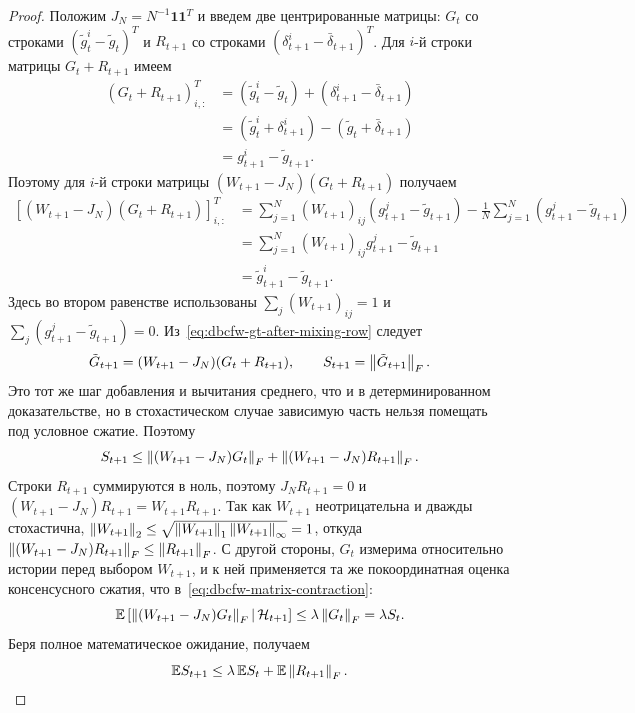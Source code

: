 \begin{proof}
Положим $J_N=N^{-1}\mathbf 1\mathbf 1^T$ и введем две центрированные матрицы:
$G_t$ со строками $(\tilde g_t^i-\tilde g_t)^T$ и
$R_{t+1}$ со строками $(\delta_{t+1}^i-\bar\delta_{t+1})^T$.
Для $i$-й строки матрицы $G_t+R_{t+1}$ имеем
\begin{align}
\label{eq:dbcfw-gt-before-mixing-row}
    (G_t+R_{t+1})_{i,:}^T
    &=
    (\tilde g_t^i-\tilde g_t)+(\delta_{t+1}^i-\bar\delta_{t+1})
    \nonumber\\
    &=
    (\tilde g_t^i+\delta_{t+1}^i)
    -
    (\tilde g_t+\bar\delta_{t+1})
    \nonumber\\
    &=
    g_{t+1}^i-\tilde g_{t+1}.
\end{align}
Поэтому для $i$-й строки матрицы $(W_{t+1}-J_N)(G_t+R_{t+1})$ получаем
\begin{align}
    \left[(W_{t+1}-J_N)(G_t+R_{t+1})\right]_{i,:}^T
    &=
    \sum_{j=1}^N (W_{t+1})_{ij}(g_{t+1}^j-\tilde g_{t+1})
    -
    \frac1N\sum_{j=1}^N(g_{t+1}^j-\tilde g_{t+1})
    \nonumber\\
    &=
    \sum_{j=1}^N (W_{t+1})_{ij}g_{t+1}^j
    -
    \tilde g_{t+1}
    \nonumber\\
    &=
    \tilde g_{t+1}^i-\tilde g_{t+1}.
    \label{eq:dbcfw-gt-after-mixing-row}
\end{align}
Здесь во втором равенстве использованы $\sum_j(W_{t+1})_{ij}=1$ и
$\sum_j(g_{t+1}^j-\tilde g_{t+1})=0$.
Из~\eqref{eq:dbcfw-gt-after-mixing-row} следует
\[
    \tilde G_{t+1}
    =
    (W_{t+1}-J_N)(G_t+R_{t+1}),
    \qquad
    S_{t+1}=\left\|\tilde G_{t+1}\right\|_F.
\]
Это тот же шаг добавления и вычитания среднего, что и в детерминированном доказательстве,
но в стохастическом случае зависимую часть нельзя помещать под условное сжатие.
Поэтому
\[
    S_{t+1}
    \leq
    \left\|(W_{t+1}-J_N)G_t\right\|_F
    +
    \left\|(W_{t+1}-J_N)R_{t+1}\right\|_F.
\]
Строки $R_{t+1}$ суммируются в ноль, поэтому $J_NR_{t+1}=0$ и
$(W_{t+1}-J_N)R_{t+1}=W_{t+1}R_{t+1}$.
Так как $W_{t+1}$ неотрицательна и дважды стохастична,
$\left\|W_{t+1}\right\|_2\leq\sqrt{\left\|W_{t+1}\right\|_1\left\|W_{t+1}\right\|_\infty}=1$, откуда
$\left\|(W_{t+1}-J_N)R_{t+1}\right\|_F\leq\left\|R_{t+1}\right\|_F$.
С другой стороны, $G_t$ измерима относительно истории перед выбором $W_{t+1}$, и к ней
применяется та же покоординатная оценка консенсусного сжатия, что
в~\eqref{eq:dbcfw-matrix-contraction}:
\[
    \mathbb{E}\left[
        \left\|(W_{t+1}-J_N)G_t\right\|_F
        \,\middle|\,\mathcal H_{t+1}
    \right]
    \leq
    \lambda\left\|G_t\right\|_F
    =
    \lambda S_t .
\]
Беря полное математическое ожидание, получаем
\begin{equation}
\label{eq:dbcfw-gt-random-recursion}
    \mathbb{E} S_{t+1}
    \leq
    \lambda\,\mathbb{E} S_t
    +
    \mathbb{E}\left\|R_{t+1}\right\|_F .
\end{equation}


\end{proof}
